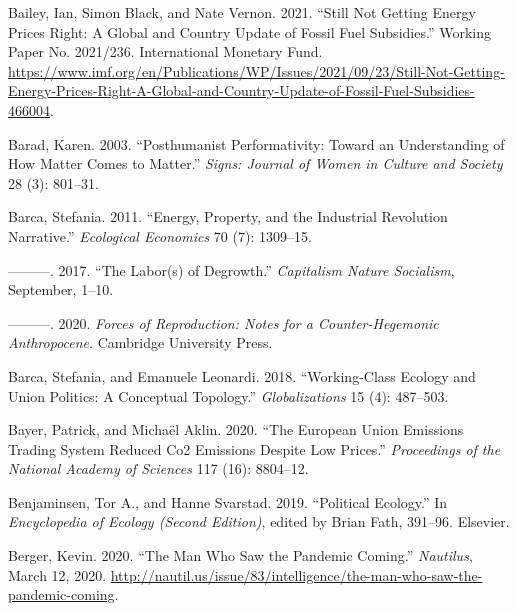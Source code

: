 \documentclass[a4paper, nobind]{templates/ociamthesis}
\newlength{\cslhangindent}
\newenvironment{CSLReferences}[2] %
 {%
  \setlength{\parindent}{0pt}
  \ifodd #1
  \let\oldpar\par
  \def\par{\hangindent=\cslhangindent\oldpar}
  \fi
  \setlength{\parskip}{1mm}
  \setlength{\baselineskip}{6mm}
 }%
 {}
\begin{document}
\begin{CSLReferences}{1}{0}
\leavevmode{}%
Bailey, Ian, Simon Black, and Nate Vernon. 2021. {``Still {Not Getting Energy Prices Right}: {A Global} and {Country Update} of {Fossil Fuel Subsidies}.''} Working Paper No. 2021/236. {International Monetary Fund}. \url{https://www.imf.org/en/Publications/WP/Issues/2021/09/23/Still-Not-Getting-Energy-Prices-Right-A-Global-and-Country-Update-of-Fossil-Fuel-Subsidies-466004}.

\leavevmode{}%
Barad, Karen. 2003. {``Posthumanist Performativity: {Toward} an Understanding of How Matter Comes to Matter.''} \emph{Signs: Journal of Women in Culture and Society} 28 (3): 801--31.

\leavevmode{}%
Barca, Stefania. 2011. {``Energy, Property, and the Industrial Revolution Narrative.''} \emph{Ecological Economics} 70 (7): 1309--15.

\leavevmode{}%
---------. 2017. {``The {Labor}(s) of {Degrowth}.''} \emph{Capitalism Nature Socialism}, September, 1--10.

\leavevmode{}%
---------. 2020. \emph{Forces of {Reproduction}: {Notes} for a {Counter-Hegemonic Anthropocene}}. {Cambridge University Press}.

\leavevmode{}%
Barca, Stefania, and Emanuele Leonardi. 2018. {``Working-Class Ecology and Union Politics: A Conceptual Topology.''} \emph{Globalizations} 15 (4): 487--503.

\leavevmode{}%
Bayer, Patrick, and Michaël Aklin. 2020. {``The {European Union Emissions Trading System} Reduced {Co2} Emissions Despite Low Prices.''} \emph{Proceedings of the National Academy of Sciences} 117 (16): 8804--12.

\leavevmode{}%
Benjaminsen, Tor A., and Hanne Svarstad. 2019. {``Political {Ecology}.''} In \emph{Encyclopedia of {Ecology} ({Second Edition})}, edited by Brian Fath, 391--96. {Elsevier}.

\leavevmode{}%
Berger, Kevin. 2020. {``The {Man Who Saw} the {Pandemic Coming}.''} \emph{Nautilus}, March 12, 2020. \url{http://nautil.us/issue/83/intelligence/the-man-who-saw-the-pandemic-coming}.


\end{CSLReferences}
\end{document}
